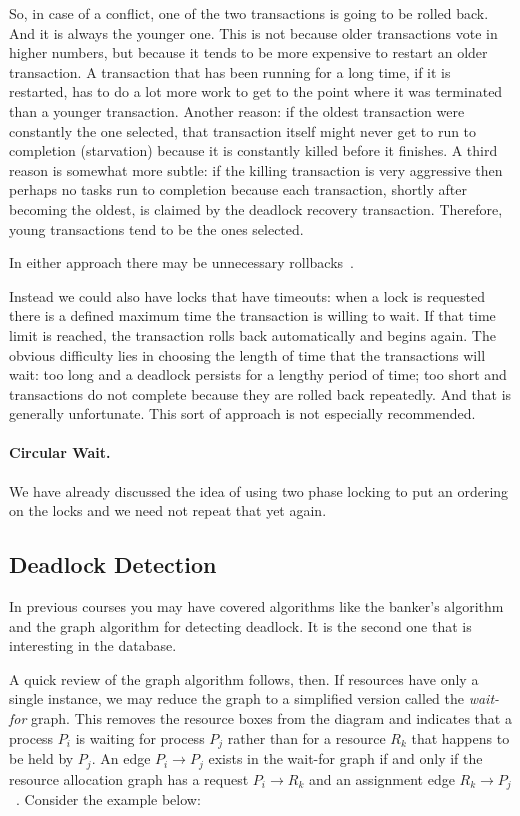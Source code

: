 \documentclass[a4paper]{report}
\begin{document}
So, in case of a conflict, one of the two transactions is going to be rolled back. And it is always the younger one. This is not because older transactions vote in higher numbers, but because it tends to be more expensive to restart an older transaction. A transaction that has been running for a long time, if it is restarted, has to do a lot more work to get to the point where it was terminated than a younger transaction. Another reason: if the oldest transaction were constantly the one selected, that transaction itself might never get to run to completion (starvation) because it is constantly killed before it finishes. A third reason is somewhat more subtle: if the killing transaction is very aggressive then perhaps no tasks run to completion because each transaction, shortly after becoming the oldest, is claimed by the deadlock recovery transaction. Therefore, young transactions tend to be the ones selected.

In either approach there may be unnecessary rollbacks~\cite{dsc}.

Instead we could also have locks that have timeouts: when a lock is requested there is a defined maximum time the transaction is willing to wait. If that time limit is reached, the transaction rolls back automatically and begins again. The obvious difficulty lies in choosing the length of time that the transactions will wait: too long and a deadlock persists for a lengthy period of time; too short and transactions do not complete because they are rolled back repeatedly. And that is generally unfortunate. This sort of approach is not especially recommended. 

\paragraph{Circular Wait.}
We have already discussed the idea of using two phase locking to put an ordering on the locks and we need not repeat that yet again. 

\subsection*{Deadlock Detection}

In previous courses you may have covered algorithms like the banker's algorithm and the graph algorithm for detecting deadlock. It is the second one that is interesting in the database.

A quick review of the graph algorithm follows, then. If resources have only a single instance, we may reduce the graph to a simplified version called the \textit{wait-for} graph. This removes the resource boxes from the diagram and indicates that a process $P_{i}$ is waiting for process $P_{j}$ rather than for a resource $R_{k}$ that happens to be held by $P_{j}$. An edge $P_{i} \rightarrow P_{j}$ exists in the wait-for graph if and only if the resource allocation graph has a request $P_{i} \rightarrow R_{k}$ and an assignment edge $R_{k} \rightarrow P_{j}$~\cite{osc}. Consider the example below:
\end{document}
